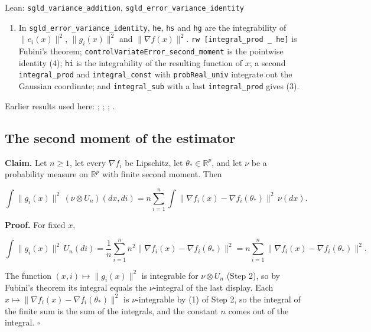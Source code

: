 \documentclass[11pt,a4paper]{report}
\begin{document}
\begin{leanbox}{Lean: \texttt{sgld\_\allowbreak{}variance\_\allowbreak{}addition}, \texttt{sgld\_\allowbreak{}error\_\allowbreak{}variance\_\allowbreak{}identity}}
\begin{enumerate}
\item In \texttt{sgld\_\allowbreak{}error\_\allowbreak{}variance\_\allowbreak{}identity}, \texttt{he}, \texttt{hs} and \texttt{hg} are the integrability of \(\|e_i(x)\|^2\), \(\|g_i(x)\|^2\) and \(\|\nabla f(x)\|^2\). \texttt{rw [integral\_\allowbreak{}prod \_\allowbreak{} he]} is Fubini's theorem; \texttt{control\allowbreak{}Variate\allowbreak{}Error\_\allowbreak{}second\_\allowbreak{}moment} is the pointwise identity (4); \texttt{hi} is the integrability of the resulting function of \(x\); a second \texttt{integral\_\allowbreak{}prod} and \texttt{integral\_\allowbreak{}const} with \texttt{prob\allowbreak{}Real\_\allowbreak{}univ} integrate out the Gaussian coordinate; and \texttt{integral\_\allowbreak{}sub} with a last \texttt{integral\_\allowbreak{}prod} gives (3).

\end{enumerate}
\end{leanbox}


Earlier results used here: \cite[Section~3.17.4]{LangevinLean2026ULASC}; \cite[Section~3.34.1]{LangevinLean2026ULASC}; \cite[Section~3.36.5]{LangevinLean2026ULASC}; \cite[Section~3.36.7]{LangevinLean2026ULASC}.
\subsection{\texorpdfstring{The second moment of the estimator}{The second moment of the estimator}}
\label{report-step-AverageLMC-SGLDLaw-lean-4}


\textbf{Claim.} Let \(n\ge1\), let every \(\nabla f_i\) be Lipschitz, let \(\theta_*\in\mathbb R^p\), and let \(\nu\) be a probability measure on \(\mathbb R^p\) with finite second moment. Then


\[\int\|g_i(x)\|^2\,(\nu\otimes U_n)(dx,di)=n\sum_{i=1}^n\int\|\nabla f_i(x)-\nabla f_i(\theta_*)\|^2\,\nu(dx).\]


\textbf{Proof.} For fixed \(x\),


\[\int\|g_i(x)\|^2\,U_n(di)=\frac1n\sum_{i=1}^n n^2\|\nabla f_i(x)-\nabla f_i(\theta_*)\|^2=n\sum_{i=1}^n\|\nabla f_i(x)-\nabla f_i(\theta_*)\|^2.\]


The function \((x,i)\mapsto\|g_i(x)\|^2\) is integrable for \(\nu\otimes U_n\) (Step 2), so by Fubini's theorem its integral equals the \(\nu\)-integral of the last display. Each \(x\mapsto\|\nabla f_i(x)-\nabla f_i(\theta_*)\|^2\) is \(\nu\)-integrable by (1) of Step 2, so the integral of the finite sum is the sum of the integrals, and the constant \(n\) comes out of the integral. \(\square\)
\end{document}
